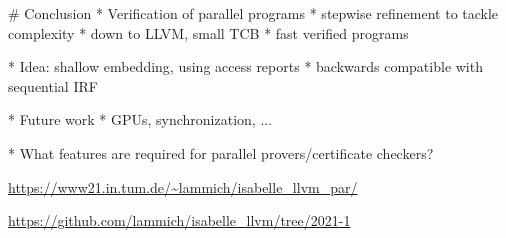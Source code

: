 \documentclass[fleqn]{beamer}
\newcommand{\high}[1]{{\color{blue}#1}}
\begin{document}
{


# Conclusion
  * Verification of parallel programs
    * stepwise refinement to tackle complexity
    * down to LLVM, small TCB
    * \high{fast} verified programs

  * Idea: shallow embedding, using access reports
    * backwards compatible with sequential IRF

  * Future work
    * GPUs, synchronization, ...

    * What features are required for parallel provers/certificate checkers?

  \vfill
  \url{https://www21.in.tum.de/~lammich/isabelle_llvm_par/}

  \url{https://github.com/lammich/isabelle_llvm/tree/2021-1}


}



\end{document}

